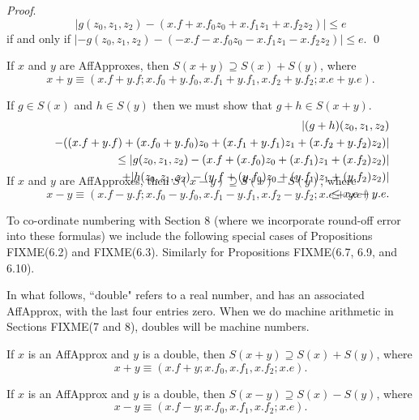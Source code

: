 {\it Proof}.
$$|g(z_0,z_1,z_2) - (x.f + x.f_0 z_0 + x.f_1 z_1 + x.f_2 z_2)| \le e$$
if and only if 
\hfill $|-g(z_0,z_1,z_2) - (-x.f - x.f_0 z_0 - x.f_1 z_1 - x.f_2 z_2)| \le e.$ \hfill\qed


 \hskip-8pt If $x$ and $y$ are {\rm AffApproxes,} then $S(x + y) \supseteq S(x)
+ S(y)${\rm ,} where
$$x + y \equiv (x.f + y.f; x.f_0 + y.f_0, x.f_1 + y.f_1, x.f_2 + y.f_2; x.e + y.e).$$
\endproclaim  

  If $g\in S(x)$ and $h \in S(y)$ then we must show that $g + h \in S(x + y).$
\begin{eqnarray*}
&&|(g + h)(z_0,z_1,z_2) \\
&&\quad- ((x.f + y.f) + (x.f_0 + y.f_0) z_0 + (x.f_1 + y.f_1) z_1 + (x.f_2 + y.f_2) z_2)| \\
&&\qquad 
\le |g(z_0,z_1,z_2) - 
(x.f + (x.f_0) z_0 + (x.f_1) z_1 + (x.f_2) z_2)| \\
&&\quad\qquad + 
|h(z_0,z_1,z_2) - (y.f + (y.f_0) z_0 + (y.f_1) z_1 + (y.f_2) z_2)| 
                                        \\
&&\qquad \le x.e + y.e.\\
\noalign{\vskip-36pt}
\end{eqnarray*}
\enddemo

 \hskip-8pt If $x$ and $y$ are {\rm AffApproxes,} then $S(x - y) \supseteq
S(x) - S(y)${\rm ,}
 where
$$x - y \equiv (x.f - y.f; x.f_0 - y.f_0, x.f_1 - y.f_1, x.f_2 - y.f_2; x.e + y.e).$$ 
\endproclaim

To co-ordinate numbering with Section 8 (where we incorporate round-off error into these formulas) we include the following special
cases of Propositions FIXME(6.2) and FIXME(6.3).  Similarly for Propositions FIXME(6.7, 6.9, and 6.10). 

In what follows,  ``double" refers to a real number, and has an associated AffApprox, with the last four entries zero.  When we do
machine arithmetic in Sections FIXME(7 and 8), doubles will be  machine numbers.

 If $x$ is an {\rm AffApprox}  and $y$ is a double{\rm ,}
 then $S(x +
y)
\supseteq S(x) + S(y)${\rm ,} where
$$x + y \equiv (x.f + y; x.f_0, x.f_1 , x.f_2 ; x.e).$$ 
\endproclaim

  If $x$ is an {\rm AffApprox} and $y$ is a double{\rm ,}
 then
$S(x - y)
\supseteq S(x) - S(y)${\rm ,} where
$$x - y \equiv (x.f - y; x.f_0, x.f_1 , x.f_2 ; x.e).$$ 
\endproclaim

